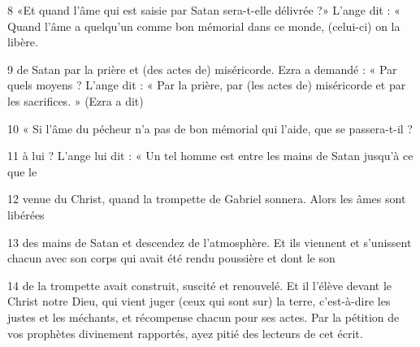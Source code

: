 \par 8 «Et quand l'âme qui est saisie par Satan sera-t-elle délivrée ?» L'ange dit : « Quand l'âme a quelqu'un comme bon mémorial dans ce monde, (celui-ci) on la libère.

\par 9 de Satan par la prière et (des actes de) miséricorde. Ezra a demandé : « Par quels moyens ? L'ange dit : « Par la prière, par (les actes de) miséricorde et par les sacrifices. » (Ezra a dit)

\par 10 « Si l'âme du pécheur n'a pas de bon mémorial qui l'aide, que se passera-t-il ?

\par 11 à lui ? L'ange lui dit : « Un tel homme est entre les mains de Satan jusqu'à ce que le

\par 12 venue du Christ, quand la trompette de Gabriel sonnera. Alors les âmes sont libérées

\par 13 des mains de Satan et descendez de l'atmosphère. Et ils viennent et s'unissent chacun avec son corps qui avait été rendu poussière et dont le son

\par 14 de la trompette avait construit, suscité et renouvelé. Et il l'élève devant le Christ notre Dieu, qui vient juger (ceux qui sont sur) la terre, c'est-à-dire les justes et les méchants, et récompense chacun pour ses actes. Par la pétition de vos prophètes divinement rapportés, ayez pitié des lecteurs de cet écrit.

